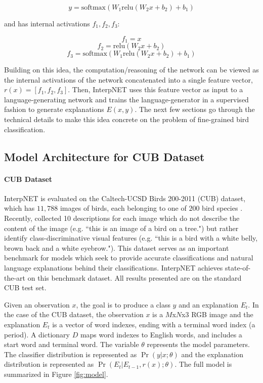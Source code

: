 \documentclass{article}
\begin{document}
$$y = \text{softmax}(W_1 \text{relu} (W_2 x + b_2) + b_1)$$

and has internal activations $f_1, f_2, f_3$:

$$f_1 = x$$
$$f_2 = \text{relu} (W_2 x + b_2)$$
$$f_3 = \text{softmax}(W_1 \text{relu} (W_2 x + b_2) + b_1)$$

Building on this idea, the computation/reasoning of the network can be viewed as the internal activations of the network concatenated into a single feature vector, $r(x) = [f_1, f_2, f_3]$. Then, InterpNET uses this feature vector as input to a language-generating network and trains the language-generator in a supervised fashion to generate explanations $E(x, y)$. The next few sections go through the technical details to make this idea concrete on the problem of fine-grained bird classification.

\subsection{Model Architecture for CUB Dataset}

\paragraph{CUB Dataset}

InterpNET is evaluated on the Caltech-UCSD Birds 200-2011 (CUB) dataset, which has $11,788$ images of birds, each belonging to one of $200$ bird species \cite{WahCUB_200_2011}. Recently, \cite{reed2016learning} collected 10 descriptions for each image which do not describe the content of the image (e.g. ``this is an image of a bird on a tree.") but rather identify class-discriminative visual features (e.g. ``this is a bird with a white belly, brown back and a white eyebrow."). This dataset serves as an important benchmark for models which seek to provide accurate classifications and natural language explanations behind their classifications. InterpNET achieves state-of-the-art on this benchmark dataset. All results presented are on the standard CUB test set.

Given an observation $x$, the goal is to produce a class $y$ and an explanation $E_t$. In the case of the CUB dataset, the observation $x$ is a $M$x$N$x$3$ RGB image and the explanation $E_t$ is a vector of word indexes, ending with a terminal word index (a period). A dictionary $D$ maps word indexes to English words, and includes a start word and terminal word. The variable $\theta$ represents the model parameters. The classifier distribution is represented as $\Pr(y|x; \theta)$ and the explanation distribution is represented as $\Pr(E_t|E_{t-1}, r(x); \theta)$. The full model is summarized in Figure \ref{fig:model}.
\end{document}
